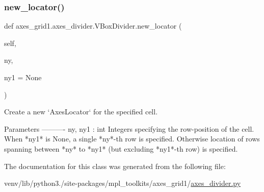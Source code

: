 \subsubsection{\texorpdfstring{new\+\_\+locator()}{new\_locator()}}
{\footnotesize\ttfamily def axes\+\_\+grid1.\+axes\+\_\+divider.\+V\+Box\+Divider.\+new\+\_\+locator (\begin{DoxyParamCaption}\item[{}]{self,  }\item[{}]{ny,  }\item[{}]{ny1 = {\ttfamily None} }\end{DoxyParamCaption})}

\begin{DoxyVerb}Create a new `AxesLocator` for the specified cell.

Parameters
----------
ny, ny1 : int
    Integers specifying the row-position of the
    cell. When *ny1* is None, a single *ny*-th row is
    specified. Otherwise location of rows spanning between *ny*
    to *ny1* (but excluding *ny1*-th row) is specified.
\end{DoxyVerb}
 

The documentation for this class was generated from the following file\+:\begin{DoxyCompactItemize}
\item 
venv/lib/python3./site-\/packages/mpl\+\_\+toolkits/axes\+\_\+grid1/\hyperlink{axes__grid1_2axes__divider_8py}{axes\+\_\+divider.\+py}\end{DoxyCompactItemize}
